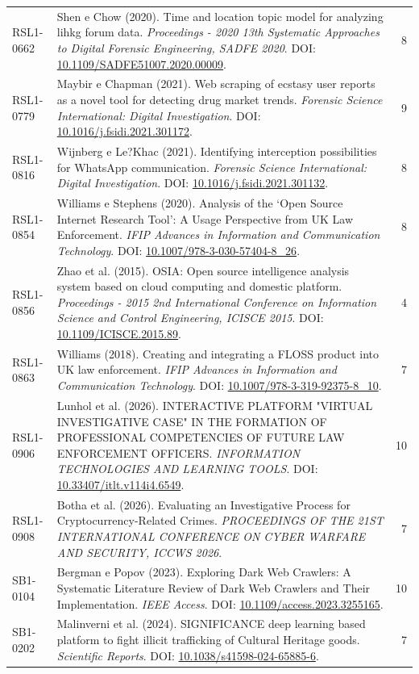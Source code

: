 \begin{small}
\begin{longtable}{lp{11.2cm}r}
RSL1-0662 & Shen e Chow (2020). Time and location topic model for analyzing lihkg forum data. \textit{Proceedings - 2020 13th Systematic Approaches to Digital Forensic Engineering, SADFE 2020}. DOI: \url{10.1109/SADFE51007.2020.00009}. & 8 \\
RSL1-0779 & Maybir e Chapman (2021). Web scraping of ecstasy user reports as a novel tool for detecting drug market trends. \textit{Forensic Science International: Digital Investigation}. DOI: \url{10.1016/j.fsidi.2021.301172}. & 9 \\
RSL1-0816 & Wijnberg e Le?Khac (2021). Identifying interception possibilities for WhatsApp communication. \textit{Forensic Science International: Digital Investigation}. DOI: \url{10.1016/j.fsidi.2021.301132}. & 8 \\
RSL1-0854 & Williams e Stephens (2020). Analysis of the ‘Open Source Internet Research Tool’: A Usage Perspective from UK Law Enforcement. \textit{IFIP Advances in Information and Communication Technology}. DOI: \url{10.1007/978-3-030-57404-8_26}. & 8 \\
RSL1-0856 & Zhao et al. (2015). OSIA: Open source intelligence analysis system based on cloud computing and domestic platform. \textit{Proceedings - 2015 2nd International Conference on Information Science and Control Engineering, ICISCE 2015}. DOI: \url{10.1109/ICISCE.2015.89}. & 4 \\
RSL1-0863 & Williams (2018). Creating and integrating a FLOSS product into UK law enforcement. \textit{IFIP Advances in Information and Communication Technology}. DOI: \url{10.1007/978-3-319-92375-8_10}. & 7 \\
RSL1-0906 & Lunhol et al. (2026). INTERACTIVE PLATFORM "VIRTUAL INVESTIGATIVE CASE" IN THE FORMATION OF PROFESSIONAL COMPETENCIES OF FUTURE LAW ENFORCEMENT OFFICERS. \textit{INFORMATION TECHNOLOGIES AND LEARNING TOOLS}. DOI: \url{10.33407/itlt.v114i4.6549}. & 10 \\
RSL1-0908 & Botha et al. (2026). Evaluating an Investigative Process for Cryptocurrency-Related Crimes. \textit{PROCEEDINGS OF THE 21ST INTERNATIONAL CONFERENCE ON CYBER WARFARE AND SECURITY, ICCWS 2026}. & 7 \\
SB1-0104 & Bergman e Popov (2023). Exploring Dark Web Crawlers: A Systematic Literature Review of Dark Web Crawlers and Their Implementation. \textit{IEEE Access}. DOI: \url{10.1109/access.2023.3255165}. & 10 \\
SB1-0202 & Malinverni et al. (2024). SIGNIFICANCE deep learning based platform to fight illicit trafficking of Cultural Heritage goods. \textit{Scientific Reports}. DOI: \url{10.1038/s41598-024-65885-6}. & 7 \\

\end{longtable}
\end{small}
